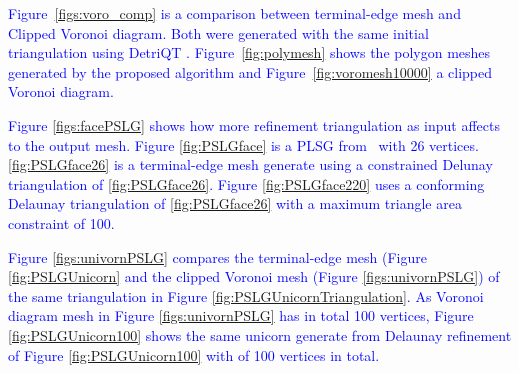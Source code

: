 \textcolor{blue}{Figure~\ref{figs:voro_comp} is a comparison between terminal-edge mesh and Clipped Voronoi diagram. Both were generated with the same initial triangulation using DetriQT \cite{Detri2}. Figure~\ref{fig:polymesh} shows the polygon meshes generated by the proposed algorithm and Figure~\ref{fig:voromesh10000} a clipped Voronoi diagram. }

\textcolor{blue}{Figure \ref{figs:facePSLG} shows how more refinement triangulation as input affects to the output mesh. Figure \ref{fig:PSLGface} is a PLSG from~\cite{Shewchuktriangle} with 26 vertices. \ref{fig:PSLGface26} is a terminal-edge mesh generate using a constrained Delunay triangulation of \ref{fig:PSLGface26}. Figure \ref{fig:PSLGface220} uses a conforming Delaunay triangulation of  \ref{fig:PSLGface26} with a  maximum triangle area constraint of 100.}

\textcolor{blue}{Figure \ref{figs:univornPSLG} compares the terminal-edge mesh (Figure \ref{fig:PSLGUnicorn} and the clipped Voronoi mesh (Figure \ref{figs:univornPSLG}) of the same triangulation in Figure \ref{fig:PSLGUnicornTriangulation}. As Voronoi diagram mesh in Figure \ref{figs:univornPSLG} has in total 100  vertices, Figure \ref{fig:PSLGUnicorn100} shows the same unicorn generate from Delaunay refinement of Figure \ref{fig:PSLGUnicorn100} with of 100 vertices in total.}








